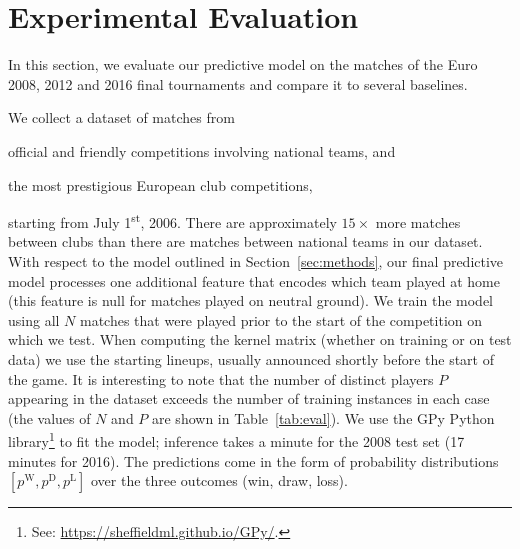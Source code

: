 \section{Experimental Evaluation}
\label{sec:evaluation}

In this section, we evaluate our predictive model on the matches of the Euro 2008, 2012 and 2016 final tournaments and compare it to several baselines.

We collect a dataset of matches from
\begin{enuminline}
\item official and friendly competitions involving national teams, and
\item the most prestigious European club competitions,
\end{enuminline}
starting from July 1\textsuperscript{st}, 2006.
There are approximately $15 \times$ more matches between clubs than there are matches between national teams in our dataset.
With respect to the model outlined in Section~\ref{sec:methods}, our final predictive model processes one additional feature that encodes which team played at home (this feature is null for matches played on neutral ground).
We train the model using all $N$ matches that were played prior to the start of the competition on which we test.
When computing the kernel matrix (whether on training or on test data) we use the starting lineups, usually announced shortly before the start of the game.
It is interesting to note that the number of distinct players $P$ appearing in the dataset exceeds the number of training instances in each case (the values of $N$ and $P$ are shown in Table~\ref{tab:eval}).
We use the GPy Python library\footnote{See: \url{https://sheffieldml.github.io/GPy/}.} to fit the model; inference takes a minute for the 2008 test set (17 minutes for 2016).
The predictions come in the form of probability distributions $[p^{\text{W}}, p^{\text{D}}, p^{\text{L}}]$ over the three outcomes (win, draw, loss).

